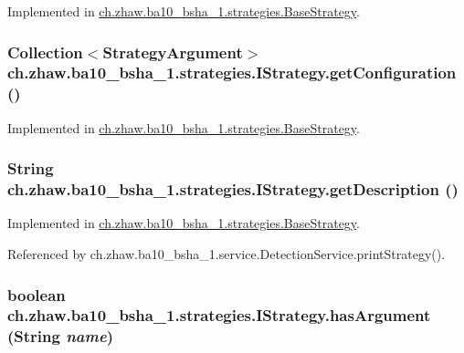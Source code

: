 Implemented in \hyperlink{classch_1_1zhaw_1_1ba10__bsha__1_1_1strategies_1_1BaseStrategy_a8c113a7ead0de41b8dbd5e58d66de08e}{ch.zhaw.ba10\_\-bsha\_\-1.strategies.BaseStrategy}.\hypertarget{interfacech_1_1zhaw_1_1ba10__bsha__1_1_1strategies_1_1IStrategy_aa03517aa764bf207ef9fccc86102ca85}{
\subsubsection[{getConfiguration}]{\setlength{\rightskip}{0pt plus 5cm}Collection$<${\bf StrategyArgument}$>$ ch.zhaw.ba10\_\-bsha\_\-1.strategies.IStrategy.getConfiguration ()}}
\label{interfacech_1_1zhaw_1_1ba10__bsha__1_1_1strategies_1_1IStrategy_aa03517aa764bf207ef9fccc86102ca85}


Implemented in \hyperlink{classch_1_1zhaw_1_1ba10__bsha__1_1_1strategies_1_1BaseStrategy_a38329740106081e084162fb2e2c25f07}{ch.zhaw.ba10\_\-bsha\_\-1.strategies.BaseStrategy}.\hypertarget{interfacech_1_1zhaw_1_1ba10__bsha__1_1_1strategies_1_1IStrategy_ab1ebc130da7b0792d736a8b5f9cf595d}{
\subsubsection[{getDescription}]{\setlength{\rightskip}{0pt plus 5cm}String ch.zhaw.ba10\_\-bsha\_\-1.strategies.IStrategy.getDescription ()}}
\label{interfacech_1_1zhaw_1_1ba10__bsha__1_1_1strategies_1_1IStrategy_ab1ebc130da7b0792d736a8b5f9cf595d}


Implemented in \hyperlink{classch_1_1zhaw_1_1ba10__bsha__1_1_1strategies_1_1BaseStrategy_a56e779e4ce93ac1570b34bcde23e7455}{ch.zhaw.ba10\_\-bsha\_\-1.strategies.BaseStrategy}.

Referenced by ch.zhaw.ba10\_\-bsha\_\-1.service.DetectionService.printStrategy().\hypertarget{interfacech_1_1zhaw_1_1ba10__bsha__1_1_1strategies_1_1IStrategy_a32756f860175f58c3d01b453cdc46bc2}{
\subsubsection[{hasArgument}]{\setlength{\rightskip}{0pt plus 5cm}boolean ch.zhaw.ba10\_\-bsha\_\-1.strategies.IStrategy.hasArgument (String {\em name})}}
\label{interfacech_1_1zhaw_1_1ba10__bsha__1_1_1strategies_1_1IStrategy_a32756f860175f58c3d01b453cdc46bc2}


